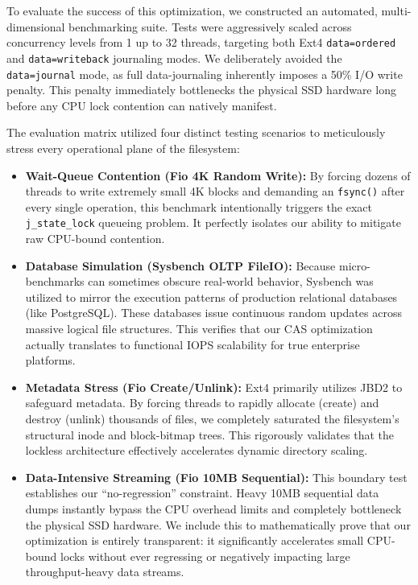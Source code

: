 To evaluate the success of this optimization, we constructed an automated, multi-dimensional benchmarking suite. Tests were aggressively scaled across concurrency levels from 1 up to 32 threads, targeting both Ext4 \texttt{data=ordered} and \texttt{data=writeback} journaling modes. We deliberately avoided the \texttt{data=journal} mode, as full data-journaling inherently imposes a 50\% I/O write penalty. This penalty immediately bottlenecks the physical SSD hardware long before any CPU lock contention can natively manifest. 

The evaluation matrix utilized four distinct testing scenarios to meticulously stress every operational plane of the filesystem:

\begin{itemize}
    \item \textbf{Wait-Queue Contention (Fio 4K Random Write):} By forcing dozens of threads to write extremely small 4K blocks and demanding an \texttt{fsync()} after every single operation, this benchmark intentionally triggers the exact \texttt{j\_state\_lock} queueing problem. It perfectly isolates our ability to mitigate raw CPU-bound contention.
    
    \item \textbf{Database Simulation (Sysbench OLTP FileIO):} Because micro-benchmarks can sometimes obscure real-world behavior, Sysbench was utilized to mirror the execution patterns of production relational databases (like PostgreSQL). These databases issue continuous random updates across massive logical file structures. This verifies that our CAS optimization actually translates to functional IOPS scalability for true enterprise platforms.
    
    \item \textbf{Metadata Stress (Fio Create/Unlink):} Ext4 primarily utilizes JBD2 to safeguard metadata. By forcing threads to rapidly allocate (create) and destroy (unlink) thousands of files, we completely saturated the filesystem's structural inode and block-bitmap trees. This rigorously validates that the lockless architecture effectively accelerates dynamic directory scaling.
    
    \item \textbf{Data-Intensive Streaming (Fio 10MB Sequential):} This boundary test establishes our ``no-regression'' constraint. Heavy 10MB sequential data dumps instantly bypass the CPU overhead limits and completely bottleneck the physical SSD hardware. We include this to mathematically prove that our optimization is entirely transparent: it significantly accelerates small CPU-bound locks without ever regressing or negatively impacting large throughput-heavy data streams.
\end{itemize}

